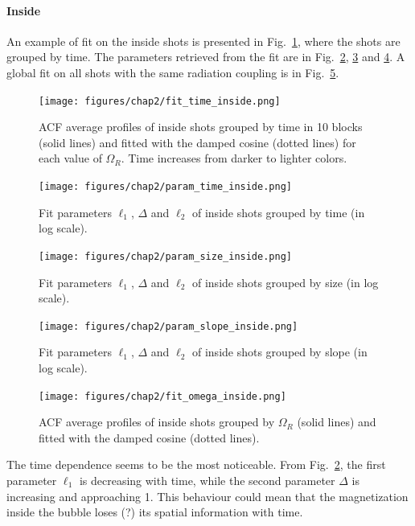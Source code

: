 \paragraph{Inside}
An example of fit on the inside shots is presented in Fig.\ \ref{fig:fit_time_inside}, where the shots are grouped by time. The parameters retrieved from the fit are in Fig.\ \ref{fig:param_time_inside}, \ref{fig:param_size_inside} and \ref{fig:param_slope_inside}. A global fit on all shots with the same radiation coupling is in Fig.\ \ref{fig:fit_omega_inside}.
\begin{figure}[h!]
    \centering
    \texttt{[image: figures/chap2/fit\_time\_inside.png]}
    \caption{ACF average profiles of inside shots grouped by time in 10 blocks (solid lines) and fitted with the damped cosine (dotted lines) for each value of $\Omega_R$. Time increases from darker to lighter colors.}
    \label{fig:fit_time_inside}
\end{figure}
\begin{figure}[h!]
    \centering
    \texttt{[image: figures/chap2/param\_time\_inside.png]}
    \caption{Fit parameters $\ell_1$, $\Delta$ and $\ell_2$ of inside shots grouped by time (in log scale).}
    \label{fig:param_time_inside}
\end{figure}
\begin{figure}[h!]
    \centering
    \texttt{[image: figures/chap2/param\_size\_inside.png]}
    \caption{Fit parameters $\ell_1$, $\Delta$ and $\ell_2$ of inside shots grouped by size (in log scale).}
    \label{fig:param_size_inside}
\end{figure}
\begin{figure}[h!]
    \centering
    \texttt{[image: figures/chap2/param\_slope\_inside.png]}
    \caption{Fit parameters $\ell_1$, $\Delta$ and $\ell_2$ of inside shots grouped by slope (in log scale).}
    \label{fig:param_slope_inside}
\end{figure}
\begin{figure}[h!]
    \centering
    \texttt{[image: figures/chap2/fit\_omega\_inside.png]}
    \caption{ACF average profiles of inside shots grouped by $\Omega_R$ (solid lines) and fitted with the damped cosine (dotted lines).}
    \label{fig:fit_omega_inside}
\end{figure}
The time dependence seems to be the most noticeable. From Fig.\ \ref{fig:param_time_inside}, the first parameter $\ell_1$ is decreasing with time, while the second parameter $\Delta$ is increasing and approaching 1. This behaviour could mean that the magnetization inside the bubble loses (?) its spatial information with time.

